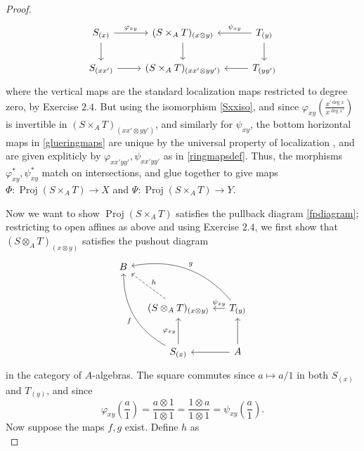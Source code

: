 \documentclass[10pt]{article}
\theoremstyle{definition}
\theoremstyle{remark}
\numberwithin{equation}{section}
\numberwithin{figure}{subsubsection}
\DeclareMathOperator{\Proj}{Proj}
\begin{document}
\begin{proof}
  \begin{equation}\label{glueringmaps}
    \begin{tikzcd}
      S_{(x)} \rar{\varphi_{xy}}\dar & (S \times_A T)_{(x \otimes y)}\dar & \arrow{l}[swap]{\psi_{xy}} T_{(y)}\dar\\
      S_{(xx')} \rar & (S \times_A T)_{(xx' \otimes yy')} & \arrow{l} T_{(yy')}
    \end{tikzcd}
  \end{equation}
  where the vertical maps are the standard localization maps restricted to
  degree zero, by Exercise $2.4$. But using the isomorphism \eqref{Sxxiso}, and since $\varphi_{xy}(\frac{x^{\prime\deg x}}{x^{\deg x'}})$ is invertible in $(S \times_A T)_{(xx' \otimes yy')}$, and similarly for $\psi_{xy}$, the bottom horizontal maps in \eqref{glueringmaps} are unique by the universal property of localization \cite[Prop.~3.1]{AM69}, and are given expliticly by $\varphi_{xx'yy'},\psi_{xx'yy'}$ as in \eqref{ringmapsdef}. Thus, the morphisms $\varphi^*_{xy},\psi^*_{xy}$ match on intersections, and glue together to give maps $\Phi\colon \Proj(S \times_A T) \to X$ and $\Psi\colon \Proj(S \times_A T) \to Y$.
  \par Now we want to show $\Proj(S \times_A T)$ satisfies the pullback diagram
  \eqref{fpdiagram}; restricting to open affines as above and using Exercise $2.4$, we first show that $(S \otimes_A T)_{(x \otimes y)}$ satisfies the pushout diagram
  \begin{equation}\label{podiagram}
    \begin{tikzcd}[column sep=small,row sep=large]
      B\arrow[bend left,leftarrow]{drr}{g}\arrow[bend right,leftarrow]{ddr}[swap]{f}\arrow[dashed,leftarrow]{dr}{h}\\
      &(S \otimes_A T)_{(x \otimes y)}\dar[swap,leftarrow]{\varphi_{xy}} \rar[leftarrow]{\psi_{xy}} & T_{(y)}\dar[leftarrow]\\
      &S_{(x)} \rar[leftarrow] & A
    \end{tikzcd}
  \end{equation}
  in the category of $A$-algebras. The square commutes since $a \mapsto a/1$ in both $S_{(x)}$ and $T_{(y)}$, and since
  \begin{equation*}
    \varphi_{xy}\left( \frac{a}{1} \right) = \frac{a \otimes 1}{1 \otimes 1} = \frac{1 \otimes a}{1 \otimes 1} = \psi_{xy}\left( \frac{a}{1} \right).
  \end{equation*}
  Now suppose the maps $f,g$ exist. Define $h$ as
  \begin{equation}\label{hdef}

\end{equation}
\end{proof}
\end{document}
